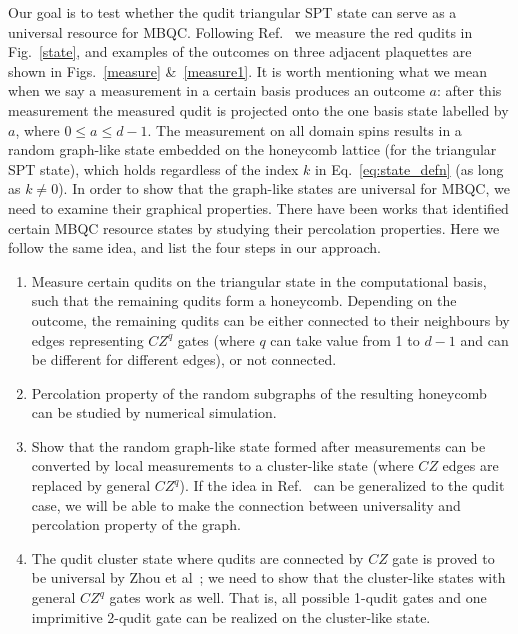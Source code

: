 \documentclass[aps,amsfonts,pra,twocolumn,showpacs]{revtex4-1}
\begin{document}
Our goal is to test whether the qudit triangular SPT state can serve as a universal resource for MBQC. Following Ref.~\cite{Miller2016} we measure the red qudits in Fig.~\ref{state}, and examples of the outcomes on three adjacent plaquettes are shown in Figs.~\ref{measure} \&~\ref{measure1}. It is worth mentioning what we mean when we say a measurement in a certain basis produces an outcome $a$: after this measurement the measured qudit is projected onto the one basis state labelled by $a$, where $0 \leq a \leq d-1$. The measurement on all domain spins results in a random graph-like state embedded on the honeycomb lattice (for the triangular SPT state), which holds regardless of the index $k$ in Eq.~\ref{eq:state_defn} (as long as $k\neq0$). In order to show that the graph-like states are universal for MBQC, we need to examine their graphical properties. There have been works \cite{Browne2008, Wei2011} that identified certain MBQC resource states by studying their percolation properties. Here we follow the same idea, and list the four steps in our approach.

\begin{enumerate}
	\item Measure certain qudits on the triangular state in the computational basis, such that the remaining qudits form a honeycomb. Depending on the outcome, the remaining qudits can be either connected to their neighbours by edges representing $CZ^q$ gates (where $q$ can take value from 1 to $d-1$ and can be different for different edges), or not connected.
	\item Percolation property of the random subgraphs of the resulting honeycomb can be studied by numerical simulation.
	\item Show that the random graph-like state formed after measurements can be converted by local measurements to a cluster-like state (where $CZ$ edges are replaced by general $CZ^q$). If the idea in Ref.~\cite{Wei2012} can be generalized to the qudit case, we will be able to make the connection between universality and percolation property of the graph.
	\item The qudit cluster state where qudits are connected by $CZ$ gate is proved to be universal by Zhou et al~\cite{Zhou2003}; we need to show that the cluster-like states with general $CZ^q$ gates work as well. That is, all possible 1-qudit gates and one imprimitive 2-qudit gate can be realized on the cluster-like state.
\end{enumerate}
\end{document}
